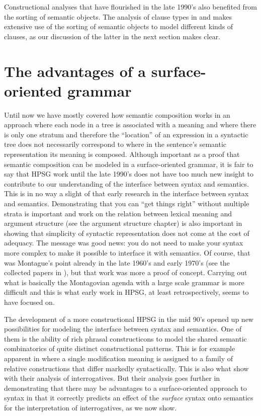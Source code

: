 \documentclass[output=paper]{langsci/langscibook}
\begin{document}
Constructional analyses that have flourished in the late 1990's also benefited from the sorting of semantic objects. The analysis  of clause types in \citet{Sag1997} and \citet{GinzburgandSag2001} makes extensive use of the sorting of semantic objects to model different kinds of clauses, as our discussion of the latter in the next section makes clear.

\section{The advantages of a surface-oriented grammar}
\label{sec:adv}

Until now we have mostly covered how semantic composition works in an approach where each node in a tree is associated with a meaning and where there is only one stratum and therefore the ``location'' of an expression in a syntactic tree does not necessarily correspond to where in the sentence's semantic representation its meaning is composed. Although important as a proof that semantic composition can be modeled in a surface-oriented grammar, it is fair to say that HPSG work until the late 1990's does not have too much new insight to contribute to our understanding of the interface between syntax and semantics. This is in no way a slight of that early research in the interface between syntax and semantics. Demonstrating that you can ``get things right'' without multiple strata is important and work on the relation between lexical meaning and argument structure (see the argument structure chapter) is also important in showing that simplicity of syntactic representation does not come at the cost of adequacy. The message was good news: you do not need to make your syntax more complex to make it possible to interface it with semantics. Of course, that was Montague's point already in the late 1960's and early 1970's (see the collected papers in \citealt{Montague1974}), but that work was more a proof of concept.  Carrying out what is basically the Montagovian agenda with a large scale grammar is more difficult and this is what early work in HPSG, at least retrospectively, seems to have focused on.

The development of a more constructional HPSG in the mid 90's opened up new possibilities for modeling the interface between syntax and semantics. One of them is the ability of rich phrasal constructicons to model the shared semantic combinatorics of quite distinct constructional patterns. This is for example apparent in \citet{Sag1997} where a single modification meaning is assigned to a family of relative constructions that differ markedly syntactically. This is also what \citet{GinzburgandSag2001} show with their analysis of interrogatives. But their analysis goes further in demonstrating that there may be advantages to a surface-oriented approach to syntax in that it correctly predicts an effect of the \emph{surface} syntax onto semantics for the interpretation of interrogatives, as we now show. 
\end{document}

